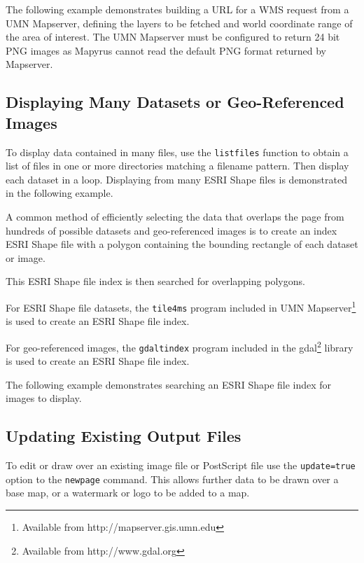 The following example demonstrates building a URL for a WMS request
from a UMN Mapserver,
defining the layers to be fetched and world coordinate range
of the area of interest.
The UMN Mapserver must be configured to return 24 bit PNG images
as Mapyrus cannot read the default PNG format returned by Mapserver.



\subsection{Displaying Many Datasets or Geo-Referenced Images}

To display data contained in many files, use the \texttt{listfiles}
function to obtain a list of files in one or more directories matching
a filename pattern.  Then display each dataset in a loop.
Displaying from many ESRI Shape files is demonstrated in the following
example.



A common method of efficiently selecting the data that overlaps the page from
hundreds of possible datasets and geo-referenced images is to create an index
ESRI Shape file with a polygon containing the bounding rectangle of each
dataset or image.

This ESRI Shape file index is then searched for overlapping polygons.

For ESRI Shape file datasets, the \texttt{tile4ms} program included in 
UMN Mapserver\footnote{Available from http://mapserver.gis.umn.edu} is used
to create an ESRI Shape file index.

For geo-referenced images, the
\texttt{gdaltindex} program included in the
gdal\footnote{Available from http://www.gdal.org}
library is used to create an ESRI Shape file index.

The following example demonstrates searching an ESRI Shape file index
for images to display.



\subsection{Updating Existing Output Files}

To edit or draw over an existing image file or PostScript file use
the \texttt{update=true} option to the \texttt{newpage} command.
This allows further data to be drawn over a base map, or a watermark
or logo to be added to a map.

